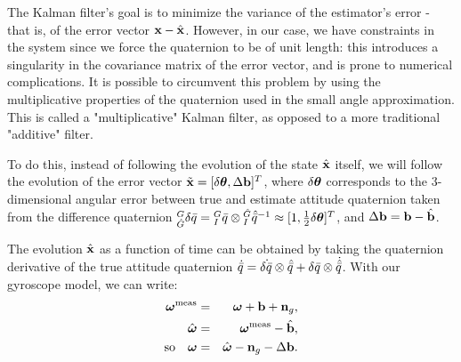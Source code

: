 
The Kalman filter's goal is to minimize the variance of the estimator's error - that is, of the error vector $\textrm{\textbf{x}}-\hat{\textrm{\textbf{x}}}$. However, in our case, we have constraints in the system since we force the quaternion to be of unit length: this introduces a singularity in the covariance matrix  of the error vector, and is prone to numerical complications. It is possible to circumvent this problem by using the multiplicative properties of the quaternion used in the small angle approximation. This is called a "multiplicative" Kalman filter, as opposed to a more traditional "additive" filter.

To do this, instead of following the evolution of the state $\hat{\textrm{\textbf{x}}}$ itself, we will follow the evolution of the error vector $\tilde{\textrm{\textbf{x}}} = [\delta\boldsymbol\theta,\Delta\textrm{\textbf{b}}]^T$, where $\delta\boldsymbol\theta$ corresponds to the 3-dimensional angular error between true and estimate attitude quaternion taken from the difference quaternion ${}_{\hat{G}}^{G}\delta\bar{q} = {}_{I}^{G}\bar{q}\otimes{}_{I}^{\hat{G}}\hat{\bar{q}}^{-1} \approx [1,\frac{1}{2}\delta\boldsymbol\theta]^T$, and $\Delta\textrm{\textbf{b}} = \textrm{\textbf{b}} - \hat{\textrm{\textbf{b}}}$. 

The evolution $\hat{\textrm{\textbf{x}}}$ as a function of time can be obtained by taking the quaternion derivative of the true attitude quaternion $\dot{\bar{q}} = \dot{\delta\bar{q}} \otimes \hat{\bar{q}} + \delta\bar{q} \otimes \dot{\hat{\bar{q}}}$. With our gyroscope model, we can write:
\begin{eqnarray}
\boldsymbol\omega^\textrm{meas} & = & \boldsymbol\omega + \textrm{\textbf{b}} + \textbf{n}_g,\\
 \hat{\boldsymbol\omega} & = & \boldsymbol\omega^\textrm{meas} - \hat{\textrm{\textbf{b}}}, \\
\textrm{so} \quad \boldsymbol\omega & = & \hat{\boldsymbol\omega} - \textbf{n}_g - \Delta\textrm{\textbf{b}}.
\end{eqnarray}



